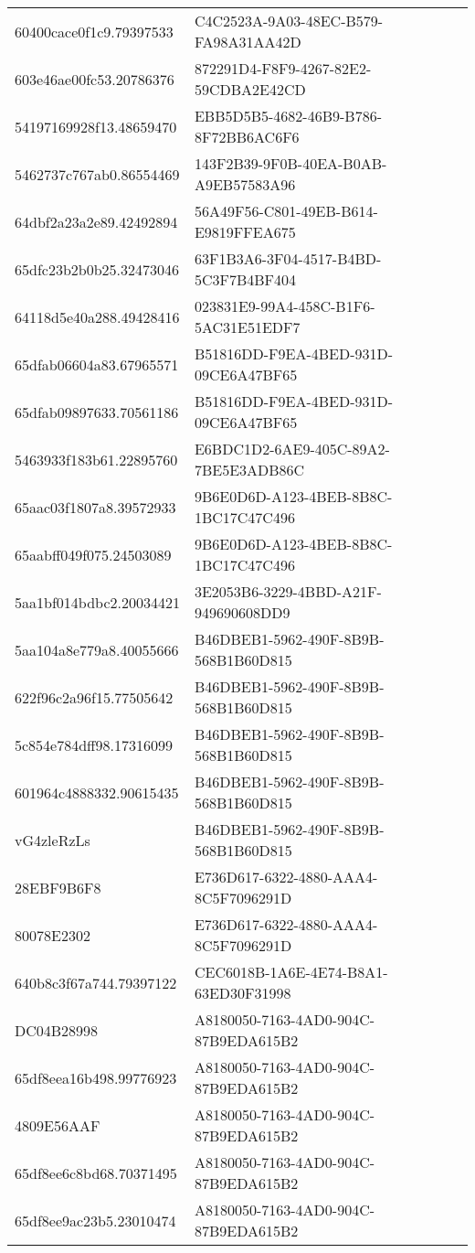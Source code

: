 \begin{tabular}{ll}
60400cace0f1c9.79397533 & C4C2523A-9A03-48EC-B579-FA98A31AA42D \\
603e46ae00fc53.20786376 & 872291D4-F8F9-4267-82E2-59CDBA2E42CD \\
54197169928f13.48659470 & EBB5D5B5-4682-46B9-B786-8F72BB6AC6F6 \\
5462737c767ab0.86554469 & 143F2B39-9F0B-40EA-B0AB-A9EB57583A96 \\
64dbf2a23a2e89.42492894 & 56A49F56-C801-49EB-B614-E9819FFEA675 \\
65dfc23b2b0b25.32473046 & 63F1B3A6-3F04-4517-B4BD-5C3F7B4BF404 \\
64118d5e40a288.49428416 & 023831E9-99A4-458C-B1F6-5AC31E51EDF7 \\
65dfab06604a83.67965571 & B51816DD-F9EA-4BED-931D-09CE6A47BF65 \\
65dfab09897633.70561186 & B51816DD-F9EA-4BED-931D-09CE6A47BF65 \\
5463933f183b61.22895760 & E6BDC1D2-6AE9-405C-89A2-7BE5E3ADB86C \\
65aac03f1807a8.39572933 & 9B6E0D6D-A123-4BEB-8B8C-1BC17C47C496 \\
65aabff049f075.24503089 & 9B6E0D6D-A123-4BEB-8B8C-1BC17C47C496 \\
5aa1bf014bdbc2.20034421 & 3E2053B6-3229-4BBD-A21F-949690608DD9 \\
5aa104a8e779a8.40055666 & B46DBEB1-5962-490F-8B9B-568B1B60D815 \\
622f96c2a96f15.77505642 & B46DBEB1-5962-490F-8B9B-568B1B60D815 \\
5c854e784dff98.17316099 & B46DBEB1-5962-490F-8B9B-568B1B60D815 \\
601964c4888332.90615435 & B46DBEB1-5962-490F-8B9B-568B1B60D815 \\
vG4zleRzLs & B46DBEB1-5962-490F-8B9B-568B1B60D815 \\
28EBF9B6F8 & E736D617-6322-4880-AAA4-8C5F7096291D \\
80078E2302 & E736D617-6322-4880-AAA4-8C5F7096291D \\
640b8c3f67a744.79397122 & CEC6018B-1A6E-4E74-B8A1-63ED30F31998 \\
DC04B28998 & A8180050-7163-4AD0-904C-87B9EDA615B2 \\
65df8eea16b498.99776923 & A8180050-7163-4AD0-904C-87B9EDA615B2 \\
4809E56AAF & A8180050-7163-4AD0-904C-87B9EDA615B2 \\
65df8ee6c8bd68.70371495 & A8180050-7163-4AD0-904C-87B9EDA615B2 \\
65df8ee9ac23b5.23010474 & A8180050-7163-4AD0-904C-87B9EDA615B2 \\

\end{tabular}
